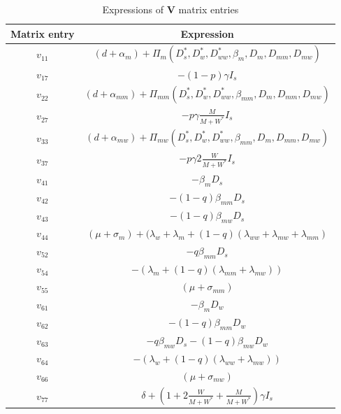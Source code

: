 \documentclass{article}
\begin{document}
\begin{table}[!ht]
\begin{tabular}{|c|c|}
\hline
Matrix entry & Expression \\
\hline
$v_{11}$ & $(d + \alpha_m) + \Pi_m(D_s^*, D_w^*, D_{ww}^*, \beta_m, D_m, D_{mm}, D_{mw}) $ \\
\hline
$v_{17}$ & $-(1 - p) \gamma I_s$ \\
\hline
$v_{22}$ &  $(d + \alpha_{mm}) + \Pi_{mm}(D_s^*, D_w^*, D_{ww}^*, \beta_{mm}, D_m, D_{mm}, D_{mw})$ \\
\hline
$v_{27}$ & $-p \gamma \frac{M}{M + W^*}  I_s$ \\
\hline
$v_{33}$ & $ (d + \alpha_{mw}) + \Pi_{mw}(D_s^*, D_w^*, D_{ww}^*, \beta_{mm}, D_m, D_{mm}, D_{mw})$ \\
\hline
$v_{37}$ & $- p \gamma 2 \frac{W}{M + W^*} I_s$ \\
\hline
$v_{41}$ & $-\beta_m D_s$ \\
\hline
$v_{42}$ & $-(1 - q) \beta_{mm} D_s$ \\
\hline
$v_{43}$ & $-(1 - q) \beta_{mw} D_s$ \\
\hline
$v_{44}$ & $(\mu + \sigma_m) + (\lambda_w + \lambda_m + (1 - q) (\lambda_{ww} + \lambda_{mw} + \lambda_{mm}) $ \\
\hline
$v_{52}$ & $- q \beta_{mm} D_s$ \\
\hline
$v_{54}$ & $-(\lambda_m + (1 - q) (\lambda_{mm} + \lambda_{mw}))$ \\
\hline
$v_{55}$ & $(\mu + \sigma_{mm})$ \\
\hline
$v_{61}$ & $-\beta_m D_w$ \\
\hline
$v_{62}$ & $ -(1 - q) \beta_{mm} D_w$ \\
\hline
$v_{63}$ & $- q \beta_{mw} D_s - (1 - q) \beta_{mw} D_w$ \\
\hline
$v_{64}$ &  $-(\lambda_w + (1 - q) (\lambda_{ww} +\lambda_{mw}))$ \\
\hline
$v_{66}$ & $(\mu + \sigma_{mw})$ \\
\hline
$v_{77}$ & $\delta + (1 + 2 \frac{W}{M + W^*} + \frac{M}{M + W^*}) \gamma I_s$ \\
\hline
\end{tabular}
\caption{Expressions of $\mathbf{V}$ matrix entries}
\label{table:Ventries}
\end{table}
\end{document}
